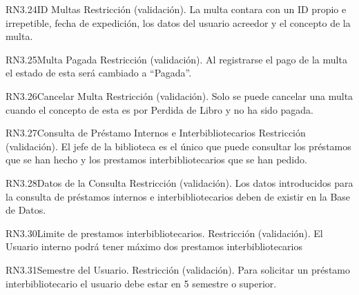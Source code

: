 \begin{BussinesRule}{RN3.24}{ID Multas} 
	\BRitem[Tipo:] Restricción (validación).
	\BRitem[Descripción:]La multa contara con un ID propio e irrepetible, fecha de expedición, los datos del usuario acreedor y el concepto de la multa.


\end{BussinesRule}

\begin{BussinesRule}{RN3.25}{Multa Pagada} 
	\BRitem[Tipo:] Restricción (validación).
	\BRitem[Descripción:]Al registrarse el pago de la multa el estado de esta será cambiado a “Pagada”.
\end{BussinesRule}

\begin{BussinesRule}{RN3.26}{Cancelar Multa} 
	\BRitem[Tipo:] Restricción (validación).
	\BRitem[Descripción:]Solo se puede cancelar una multa cuando el concepto de esta es por Perdida de Libro y no ha sido pagada.
\end{BussinesRule}

\begin{BussinesRule}{RN3.27}{Consulta de Préstamo Internos e Interbibliotecarios} 
	\BRitem[Tipo:] Restricción (validación).
	\BRitem[Descripción:]El jefe de la biblioteca es el único que puede consultar los préstamos que se han hecho y los prestamos interbibliotecarios que se han pedido.
\end{BussinesRule}

\begin{BussinesRule}{RN3.28}{Datos de la Consulta} 
	\BRitem[Tipo:] Restricción (validación).
	\BRitem[Descripción:]Los datos introducidos para la consulta de préstamos internos e interbibliotecarios deben de existir en la Base de Datos.
\end{BussinesRule}

\begin{BussinesRule}{RN3.30}{Limite de prestamos interbibliotecarios.} 
	\BRitem[Tipo:] Restricción (validación).
	\BRitem[Descripción:]El Usuario interno podrá tener máximo dos prestamos interbibliotecarios
\end{BussinesRule}

\begin{BussinesRule}{RN3.31}{Semestre del Usuario.} 
	\BRitem[Tipo:] Restricción (validación).
	\BRitem[Descripción:]Para solicitar un préstamo interbibliotecario el usuario debe estar en 5 semestre o superior.
\end{BussinesRule}

